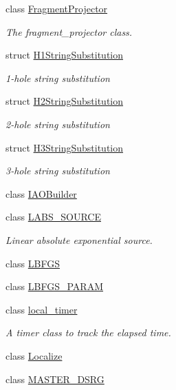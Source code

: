 \begin{DoxyCompactItemize}
class \mbox{\hyperlink{classforte_1_1_fragment_projector}{Fragment\+Projector}}
\begin{DoxyCompactList}\small\item\em The fragment\+\_\+projector class. \end{DoxyCompactList}\item 
struct \mbox{\hyperlink{structforte_1_1_h1_string_substitution}{H1\+String\+Substitution}}
\begin{DoxyCompactList}\small\item\em 1-\/hole string substitution \end{DoxyCompactList}\item 
struct \mbox{\hyperlink{structforte_1_1_h2_string_substitution}{H2\+String\+Substitution}}
\begin{DoxyCompactList}\small\item\em 2-\/hole string substitution \end{DoxyCompactList}\item 
struct \mbox{\hyperlink{structforte_1_1_h3_string_substitution}{H3\+String\+Substitution}}
\begin{DoxyCompactList}\small\item\em 3-\/hole string substitution \end{DoxyCompactList}\item 
class \mbox{\hyperlink{classforte_1_1_i_a_o_builder}{I\+A\+O\+Builder}}
\item 
class \mbox{\hyperlink{classforte_1_1_l_a_b_s___s_o_u_r_c_e}{L\+A\+B\+S\+\_\+\+S\+O\+U\+R\+CE}}
\begin{DoxyCompactList}\small\item\em Linear absolute exponential source. \end{DoxyCompactList}\item 
class \mbox{\hyperlink{classforte_1_1_l_b_f_g_s}{L\+B\+F\+GS}}
\item 
class \mbox{\hyperlink{classforte_1_1_l_b_f_g_s___p_a_r_a_m}{L\+B\+F\+G\+S\+\_\+\+P\+A\+R\+AM}}
\item 
class \mbox{\hyperlink{classforte_1_1local__timer}{local\+\_\+timer}}
\begin{DoxyCompactList}\small\item\em A timer class to track the elapsed time. \end{DoxyCompactList}\item 
class \mbox{\hyperlink{classforte_1_1_localize}{Localize}}
\item 
class \mbox{\hyperlink{classforte_1_1_m_a_s_t_e_r___d_s_r_g}{M\+A\+S\+T\+E\+R\+\_\+\+D\+S\+RG}}

\end{DoxyCompactItemize}
